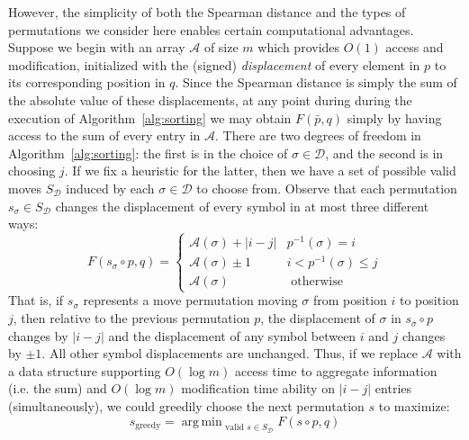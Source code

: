 \documentclass{siamart190516}
\DeclareMathOperator*{\argmin}{arg\,min}
\begin{document}
However, the simplicity of both the Spearman distance and the types of permutations we consider here enables certain computational advantages. Suppose we begin with an array $\mathcal{A}$ of size $m$ which provides $O(1)$ access and modification, initialized with the (signed) \emph{displacement} of every element in $p$ to its corresponding position in $q$. Since the Spearman distance is simply the sum of the absolute value of these displacements, at any point during during the execution of Algorithm~\ref{alg:sorting} we may obtain $F(\bar{p}, q)$ simply by having access to the sum of every entry in $\mathcal{A}$. There are two degrees of freedom in   Algorithm~\ref{alg:sorting}: the first is in the choice of $\sigma \in \mathcal{D}$, and the second is in choosing $j$. If we fix a heuristic for the latter, then we have a set of possible valid moves $S_\mathcal{D}$ induced by each $\sigma \in \mathcal{D}$ to choose from. Observe that each permutation $s_\sigma \in S_\mathcal{D}$ changes the displacement of every symbol in at most three different ways: 
\[
F(s_\sigma \circ p, q) = 
\begin{cases} 
	 \mathcal{A}(\sigma) + \lvert i - j \rvert & p^{-1}(\sigma) = i \\
	 \mathcal{A}(\sigma) \pm 1 & i < p^{-1}(\sigma) \leq j \\
	 \mathcal{A}(\sigma) & \text{ otherwise }
\end{cases}
\]
That is, if $s_\sigma$ represents a move permutation moving $\sigma$ from position $i$ to position $j$, then relative to the previous permutation $p$, the displacement of $\sigma$ in $s_\sigma \circ p$ changes by $\lvert i - j \rvert$ and the displacement of any symbol between $i$ and $j$ changes by $\pm 1$. 
All other symbol displacements are unchanged. Thus, if we replace $\mathcal{A}$ with a data structure  supporting $O(\log m)$ access time to aggregate information (i.e. the sum) and $O(\log m)$ modification time ability on $\lvert i - j \vert$ entries (simultaneously), we could greedily choose the next permutation $s$ to maximize:
\begin{equation}\label{eq:greedy_step}
	s_{\text{greedy}} = \argmin_{\text{ valid } s \in S_\mathcal{D}} F(s\circ p, q)
\end{equation}  
\end{document}
